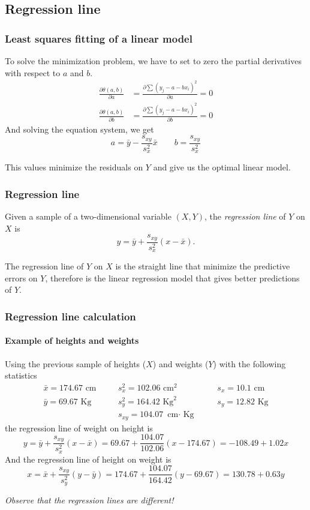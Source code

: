 \subsection{Regression line}
\begin{frame}
\frametitle{Least squares fitting of a linear model}
To solve the minimization problem, we have to set to zero the partial derivatives with respect to $a$ and $b$.  
\begin{align*}
\frac{\partial \theta(a,b)}{\partial a} &=  \frac{\partial \sum (y_j-a-bx_i)^2 }{\partial a} =0\\
\frac{\partial \theta(a,b)}{\partial b} &=  \frac{\partial \sum (y_j-a-bx_i)^2 }{\partial b} =0
\end{align*}
And solving the equation system, we get
\[
a= \bar y - \frac{s_{xy}}{s_x^2}\bar x \qquad b=\frac{s_{xy}}{s_x^2}
\]

This values minimize the residuals on $Y$ and give us the optimal linear model.
\end{frame}


\begin{frame}
\frametitle{Regression line}
\begin{definition}
Given a sample of a two-dimensional variable $(X,Y)$, the \emph{regression line} of $Y$ on $X$ is
\[
y = \bar y +\frac{s_{xy}}{s_x^2}(x-\bar x).
\]
\end{definition}

The regression line of $Y$ on $X$ is the straight line that minimize the predictive errors on $Y$, therefore is the
linear regression model that gives better predictions of $Y$.
\end{frame}


\begin{frame}
\frametitle{Regression line calculation}
\framesubtitle{Example of heights and weights}
Using the previous sample of heights ($X$) and weights ($Y$) with the following statistics
\[
\begin{array}{lllll}
\bar x = 174.67 \mbox{ cm} & \quad & s^2_x = 102.06 \mbox{ cm}^2 & \quad & s_x = 10.1 \mbox{ cm}\\
\bar y = 69.67 \mbox{ Kg} & & s^2_y = 164.42 \mbox{ Kg}^2 & & s_y = 12.82 \mbox{ Kg}\\
& & s_{xy} = 104.07 \mbox{ cm$\cdot$ Kg} & &
\end{array}
\]
the regression line of weight on height is  
\[
y = \bar y +\frac{s_{xy}}{s_x^2}(x-\bar x) = 69.67+\frac{104.07}{102.06}(x-174.67) = -108.49 +1.02 x
\]
And the regression line of height on weight is 
\[
x = \bar x +\frac{s_{xy}}{s_y^2}(y-\bar y) = 174.67+\frac{104.07}{164.42}(y-69.67) = 130.78 + 0.63 y
\]
\begin{center}
\emph{Observe that the regression lines are different!}
\end{center}
\end{frame}


